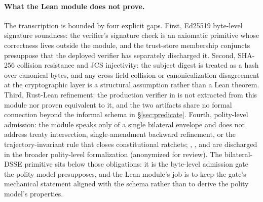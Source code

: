 \paragraph{What the Lean module does not prove.} The transcription is bounded by four explicit gaps. First, Ed25519 byte-level signature soundness: the verifier's signature check is an axiomatic primitive whose correctness lives outside the module, and the trust-store membership conjuncts presuppose that the deployed verifier has separately discharged it. Second, SHA-256 collision resistance and JCS injectivity: the subject digest is treated as a hash over canonical bytes, and any cross-field collision or canonicalization disagreement at the cryptographic layer is a structural assumption rather than a Lean theorem. Third, Rust-Lean refinement: the production verifier in  is not extracted from this module nor proven equivalent to it, and the two artifacts share no formal connection beyond the informal schema in \S\ref{sec:predicate}. Fourth, polity-level admission: the module speaks only of a single bilateral envelope and does not address treaty intersection, single-amendment backward refinement, or the trajectory-invariant rule that closes constitutional ratchets; , , and  are discharged in the broader polity-level formalization (anonymized for review). The bilateral-DSSE primitive sits below those obligations: it is the byte-level admission gate the polity model presupposes, and the Lean module's job is to keep the gate's mechanical statement aligned with the schema rather than to derive the polity model's properties.
